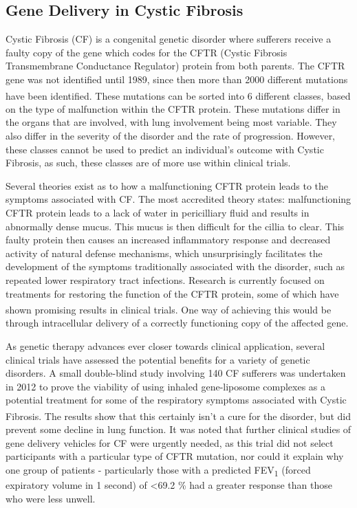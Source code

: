 \subsection{Gene Delivery in Cystic Fibrosis}
Cystic Fibrosis (CF) is a congenital genetic disorder where sufferers receive a faulty copy of the gene which codes for the CFTR (Cystic Fibrosis Transmembrane Conductance Regulator) protein from both parents.
The CFTR gene was not identified until 1989, since then more than 2000 different mutations have been identified.\textsuperscript{\cite{Castellani2017CysticView} } These mutations can be sorted into 6 different classes, based on the type of malfunction within the CFTR protein. 
These mutations differ in the organs that are involved, with lung involvement being most variable. They also differ in the severity of the disorder and the rate of progression. However, these classes cannot be used to predict an individual's outcome with Cystic Fibrosis, as such, these classes are of more use within clinical trials. 

Several theories exist as to how a malfunctioning CFTR protein leads to the symptoms associated with CF.  The most accredited theory states: malfunctioning CFTR protein leads to a lack of water in pericilliary fluid and results in abnormally dense mucus. This mucus is then difficult for the cillia to clear. This faulty protein then causes an increased inflammatory response and decreased activity of natural defense mechanisms, which unsurprisingly facilitates the development of  the symptoms traditionally associated with the disorder, such as repeated lower respiratory tract infections. 
\newline
Research is currently focused on treatments for restoring the function of the CFTR protein, some of which have shown promising results in clinical trials.\textsuperscript{\cite{Castellani2017CysticView}} One way of achieving this would be through intracellular delivery of a correctly functioning copy of the affected gene.  

As genetic therapy advances ever closer towards clinical application, several clinical trials have assessed the potential benefits for a variety of genetic disorders.  A small double-blind study involving 140 CF sufferers was undertaken in 2012 to prove the viability of using inhaled gene-liposome complexes as a potential treatment for some of the respiratory symptoms associated with Cystic Fibrosis.\textsuperscript{\cite{Alton2015RepeatedTrial}} The results show that this certainly isn't a cure for the disorder, but did prevent some decline in lung function. It was noted that further clinical studies of gene delivery vehicles for CF were urgently needed, as this trial did not select participants with a particular type of CFTR mutation, nor could it explain why one group of patients - particularly those with a predicted FEV\textsubscript{1} (forced expiratory volume in 1 second) of <69.2 \% had a greater response than those who were less unwell. 
